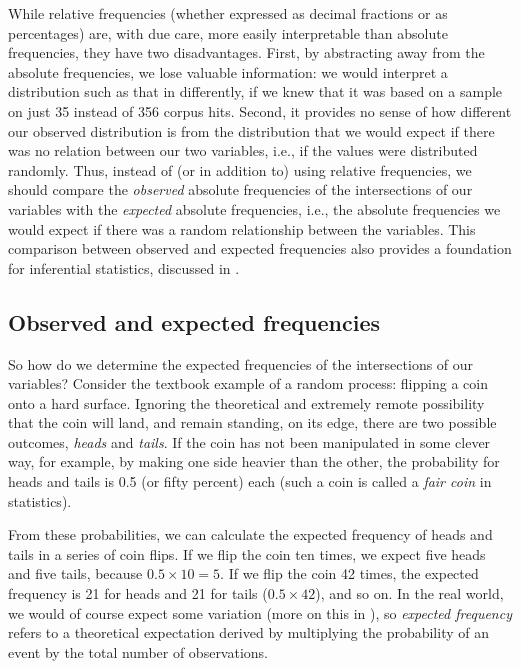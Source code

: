 While relative frequencies  (whether expressed as decimal fractions or as percentages) are, with due care, more easily interpretable than absolute frequencies, they have two disadvantages. First, by abstracting away from the absolute frequencies,  we lose valuable information: we would interpret a distribution  such as that in  differently, if we knew that it was based on a sample on just 35 instead of 356 corpus hits. Second, it provides no sense of how different our observed distribution is from the distribution that we would expect if there was no relation between our two variables, i.e., if the values were distributed randomly.  Thus, instead of (or in addition to) using relative frequencies,  we should compare the \emph{observed} absolute frequencies of the intersections of our variables with the \emph{expected}  absolute frequencies, i.e., the absolute frequencies  we would expect if there was a random relationship between the variables. This comparison between observed and expected frequencies also provides a foundation for inferential statistics,  discussed in .

\subsection{Observed and expected frequencies}
\label{sec:observedexpected}

So how do we determine the expected  frequencies  of the intersections of our variables? Consider the textbook example of a random  process: flipping a coin onto a hard surface. Ignoring the theoretical and extremely remote possibility that the coin will land, and remain standing, on its edge, there are two possible outcomes, \textit{heads} and \textit{tails}. If the coin has not been manipulated in some clever way, for example, by making one side heavier than the other, the probability  for heads and tails is 0.5 (or fifty percent) each (such a coin is called a \textit{fair coin} in  statistics).

From these probabilities,  we can calculate the expected  frequency of heads and tails in a series of coin flips. If we flip the coin ten times, we expect five heads and five tails, because $0.5 \times 10 = 5$. If we flip the coin 42 times, the expected frequency  is 21 for heads and 21 for tails ($0.5 \times 42$), and so on. In the real world, we would of course expect some variation  (more on this in ), so \textit{expected frequency} refers to a theoretical expectation derived by multiplying the probability  of an event by the total number of  observations.

